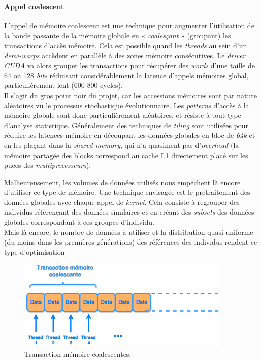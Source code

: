 \documentclass[french, 11pt]{memoir}
\begin{document}
\paragraph{Appel coalescent}\label{appel-coalescent}

L'appel de mémoire coalescent est une technique pour augmenter
l'utilisation de la bande passante de la mémoire globale en «
\emph{coalesçant }» (groupant) les transactions d'accès mémoire. Cela
est possible quand les \emph{threads} au sein d'un \emph{demi-warps}
accèdent en parallèle à des zones mémoire consécutives. Le \emph{driver
CUDA} va alors grouper les transactions pour récupérer des \emph{words}
d'une taille de 64 ou 128 \emph{bits} réduisant considérablement la
latence d'appels mémoires global, particulièrement lent (600-800
cycles). \\
Il s'agit du gros point noir du projet, car les accessions
mémoires sont par nature aléatoires vu le processus stochastique
évolutionnaire. Les \emph{patterns} d'accès à la mémoire globale sont
donc particulièrement aléatoires, et résiste à tout type d'analyse
statistique. Généralement des techniques de \emph{tiling} sont utilisées
pour réduire les latences mémoire en découpant les données globales en
bloc de \textit{64k} et en les plaçant dans la \textit{shared memory}, qui n'a quasiment
pas d'\emph{overhead} (la mémoire partagée des blocks correspond au
cache L1 directement placé sur les puces des \emph{multiprocesseurs}).

\bigskip
Malheureusement, les volumes de données utilisés nous empêchent là
encore d'utiliser ce type de mémoire. Une technique envisagée est le
prétraitement des données globales avec chaque appel de \emph{kernel}.
Cela consiste à regrouper des individus référençant des données
similaires et en créant des \emph{subsets} des données globales
correspondant à ces groupes d'individu. \\
Mais là encore, le nombre de données à utiliser et la distribution quasi
uniforme (du moins dans les premières générations) des références des
individus rendent ce type d'optimisation

\begin{figure}[htbp]
	\begin{center}
		\includegraphics[width=4in]{img/coalescent.png}
		\caption{Transaction mémoire coalescentes.}
	\end{center}
\end{figure}
\end{document}
